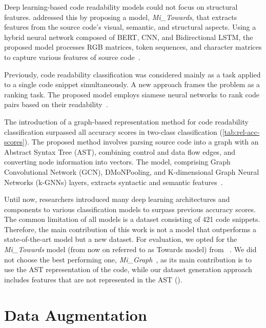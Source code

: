 \documentclass[%
class=scrreprt,
chapterprefix=false,%
open=right,%
twoside=true,%
paper=a4,%
logofile={Logo\_zentral\_farbig\_EN.png},%
thesistype=master,%
UKenglish,%
]{se2thesis}
\theoremstyle{definition}
\newcommand{\numMerged}{421\xspace}
\begin{document}
	Deep learning-based code readability models could not focus on structural features. \citeauthor{mi2022towards} addressed this by proposing a model, \textit{Mi\_Towards}, that extracts features from the source code's visual, semantic, and structural aspects. Using a hybrid neural network composed of BERT, CNN, and Bidirectional LSTM, the proposed model processes RGB matrices, token sequences, and character matrices to capture various features of source code~\cite{mi2022towards}.
	
	Previously, code readability classification was considered mainly as a task applied to a single code snippet simultaneously. A new approach frames the problem as a ranking task. The proposed model employs siamese neural networks to rank code pairs based on their readability~\cite{mi2022rank}.

	The introduction of a graph-based representation method for code readability classification surpassed all accuracy scores in two-class classification (\autoref{tab:rel-acc-scores}). The proposed method involves parsing source code into a graph with an Abstract Syntax Tree (AST), combining control and data flow edges, and converting node information into vectors. The model, comprising Graph Convolutional Network (GCN), DMoNPooling, and K-dimensional Graph Neural Networks (k-GNNs) layers, extracts syntactic and semantic features~\cite{mi2023graph}.
		
	Until now, researchers introduced many deep learning architectures and components to various classification models to surpass previous accuracy scores. The common limitation of all models is a dataset consisting of \numMerged code snippets.
	Therefore, the main contribution of this work is not a model that outperforms a state-of-the-art model but a new dataset. For evaluation, we opted for the \textit{Mi\_Towards} model (from now on referred to as Towards model) from \citeauthor{mi2022towards}~\cite{mi2022towards}. We did not choose the best performing one, \textit{Mi\_Graph}~\cite{mi2023graph}, as its main contribution is to use the AST representation of the code, while our dataset generation approach includes features that are not represented in the AST ().
			
\section{Data Augmentation} \label{Data Augmentation}
\end{document}
